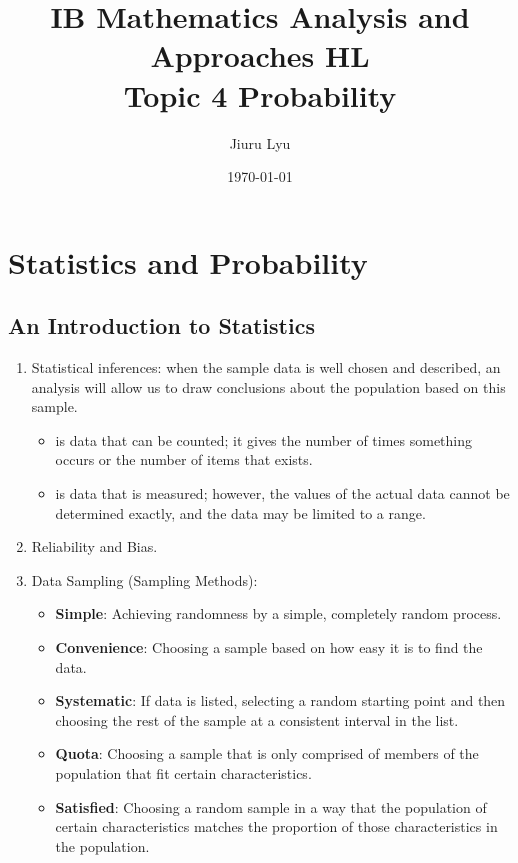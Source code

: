 \documentclass[12pt, a4paper]{article}
\title{\textbf{IB Mathematics Analysis and Approaches HL}\\
Topic 4 Probability}
\author{Jiuru Lyu}
\date{\today}
\begin{document}
\maketitle
\tableofcontents

\newpage

\section{Statistics and Probability}
\subsection{An Introduction to Statistics}
\begin{enumerate}
    \item Statistical inferences: when the sample data is well chosen and described, an analysis will allow us to draw conclusions about the population based on this sample. 
    \begin{itemize}
        \item \textbf{\color{red}{Discrete data}} is data that can be counted; it gives the number of times something occurs or the number of items that exists.
        \item \textbf{\color{red}{Continuous data}} is data that is measured; however, the values of the actual data cannot be determined exactly, and the data may be limited to a range.
    \end{itemize}
    \item Reliability and Bias. 
    \item Data Sampling (Sampling Methods): 
    \begin{itemize}
        \item \textbf{Simple}: Achieving randomness by a simple, completely random process.
        \item \textbf{Convenience}: Choosing a sample based on how easy it is to find the data. 
        \item \textbf{Systematic}: If data is listed, selecting a random starting point and then choosing the rest of the sample at a consistent interval in the list. 
        \item \textbf{Quota}: Choosing a sample that is only comprised of members of the population that fit certain characteristics. 
        \item \textbf{Satisfied}: Choosing a random sample in a way that the population of certain characteristics matches the proportion of those characteristics in the population. 
    \end{itemize}

\end{enumerate}
\end{document}
